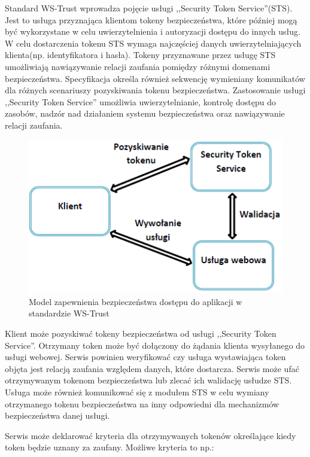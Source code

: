 		Standard WS-Trust wprowadza pojęcie usługi ,,Security Token Service''(STS). Jest to usługa przyznająca klientom tokeny bezpieczeństwa, które później mogą być wykorzystane w celu uwierzytelnienia i autoryzacji dostępu do innych usług. W celu dostarczenia tokenu STS wymaga najczęściej danych uwierzytelniających klienta(np. identyfikatora i hasła). Tokeny przyznawane przez usługę STS umożliwiają nawiązywanie relacji zaufania pomiędzy różnymi domenami bezpieczeństwa. Specyfikacja określa również sekwencję wymieniany komunikatów dla różnych scenariuszy pozyskiwania tokenu bezpieczeństwa. Zastosowanie usługi ,,Security Token Service'' umożliwia uwierzytelnianie, kontrolę dostępu do zasobów, nadzór nad działaniem systemu bezpieczeństwa oraz nawiązywanie relacji zaufania.

		\begin{figure}[h]
			\centering
				\includegraphics{img/ws-trust.png}
			\caption{Model zapewnienia bezpieczeństwa dostępu do aplikacji w standardzie WS-Trust}
			\label{Model zapewnienia bezpieczeństwa dostępu do aplikacji w standardzie WS-Trust}
		\end{figure}

		Klient może pozyskiwać tokeny bezpieczeństwa od usługi ,,Security Token Service''. Otrzymany token może być dołączony do żądania klienta wysyłanego do usługi webowej. Serwis powinien weryfikować czy usługa wystawiająca token objęta jest relacją zaufania względem danych, które dostarcza. Serwis może ufać otrzymywanym tokenom bezpieczeństwa lub zlecać ich walidację usłudze STS. Usługa może również komunikować się z modułem STS w celu wymiany otrzymanego tokenu bezpieczeństwa na inny odpowiedni dla mechanizmów bezpieczeństwa danej usługi. 

		Serwis może deklarować kryteria dla otrzymywanych tokenów określające kiedy token będzie uznany za zaufany\cite{WS-Trust-1.4-with-errata}. Możliwe kryteria to np.:

